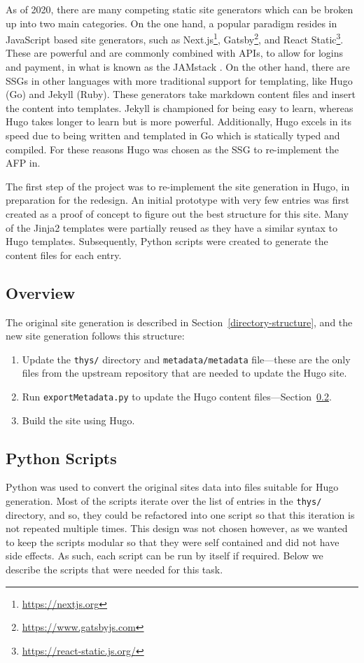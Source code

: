 \documentclass[bsc,frontabs,oneside,singlespacing,parskip,deptreport,logo]{infthesis}
\begin{document}
As of 2020, there are many competing static site generators which can be broken up into two main categories. On the one hand, a popular paradigm resides in JavaScript based site generators, such as Next.js\footnote{\url{https://nextjs.org}}, Gatsby\footnote{\url{https://www.gatsbyjs.com}}, and React Static\footnote{\url{https://react-static.js.org/}}. These are powerful and are commonly combined with APIs, to allow for logins and payment, in what is known as the JAMstack \cite{jamstack}. On the other hand, there are SSGs in other languages with more traditional support for templating, like Hugo (Go) and Jekyll (Ruby). These generators take markdown content files and insert the content into templates. Jekyll is championed for being easy to learn, whereas Hugo takes longer to learn but is more powerful. Additionally, Hugo excels in its speed due to being written and templated in Go which is statically typed and compiled. For these reasons Hugo was chosen as the SSG to re-implement the AFP in.

\cbstart
The first step of the project was to re-implement the site generation in Hugo, in preparation for the redesign. An initial prototype with very few entries was first created as a proof of concept to figure out the best structure for this site. Many of the Jinja2 templates were partially reused as they have a similar syntax to Hugo templates. Subsequently, Python scripts were created to generate the content files for each entry. 
\cbend
\subsection{Overview}

The original site generation is described in Section~\ref{directory-structure}, and the new site generation follows this structure:

\begin{enumerate}
    \item Update the \texttt{thys/} directory and \texttt{metadata/metadata} file---these are the only files from the upstream repository that are needed to update the Hugo site.
    \item Run \texttt{exportMetadata.py} to update the Hugo content files---Section~\ref{python-scripts}.
    \item Build the site using Hugo.
\end{enumerate}

\subsection{Python Scripts} \label{python-scripts}
\cbstart
Python was used to convert the original sites data into files suitable for Hugo generation. Most of the scripts iterate over the list of entries in the \texttt{thys/} directory, and so, they could be refactored into one script so that this iteration is not repeated multiple times. This design was not chosen however, as we wanted to keep the scripts modular so that they were self contained and did not have side effects. As such, each script can be run by itself if required. Below we describe the scripts that were needed for this task. 
\cbend
\end{document}
